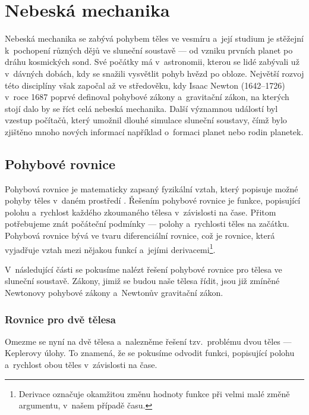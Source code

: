 \documentclass[A4paper, 12pt, oneside]{book}
\begin{document}
\chapter{Nebeská mechanika} \label{ch:celmech}
Nebeská mechanika se zabývá pohybem těles ve vesmíru a~její studium je stěžejní k~pochopení různých dějů ve sluneční soustavě --- od vzniku prvních planet po dráhu kosmických sond. Své počátky má v~astronomii, kterou se lidé zabývali už v~dávných dobách, kdy se snažili vysvětlit pohyb hvězd po obloze. Největší rozvoj této disciplíny však započal až ve středověku, kdy Isaac Newton (1642--1726) v~roce 1687 poprvé definoval pohybové zákony a~gravitační zákon, na kterých stojí dalo by se říct celá nebeská mechanika. Další významnou událostí byl vzestup počítačů, který umožnil dlouhé simulace sluneční soustavy, čímž bylo zjištěno mnoho nových informací například o~formaci planet nebo rodin planetek.

\section{Pohybové rovnice}
Pohybová rovnice je matematicky zapsaný fyzikální vztah, který popisuje možné pohyby těles v~daném prostředí \cite{wiki:eqm}. Řešením pohybové rovnice je funkce, popisující polohu a~rychlost každého zkoumaného tělesa v~závislosti na čase. Přitom potřebujeme znát počáteční podmínky --- polohy a~rychlosti těles na začátku. Pohybová rovnice bývá ve tvaru diferenciální rovnice, což je rovnice, která vyjadřuje vztah mezi nějakou funkcí a~jejími derivacemi\footnote{Derivace označuje okamžitou změnu hodnoty funkce při velmi malé změně argumentu, v~našem případě času.}.

V~následující části se pokusíme nalézt řešení pohybové rovnice pro tělesa ve sluneční soustavě. Zákony, jimiž se budou naše tělesa řídit, jsou již zmíněné Newtonovy pohybové zákony a~Newtonův gravitační zákon.
\subsection{Rovnice pro dvě tělesa} \label{sec:2body}
Omezme se nyní na dvě tělesa a~nalezněme řešení tzv.\ problému dvou těles --- Keplerovy úlohy. To znamená, že se pokusíme odvodit funkci, popisující polohu a~rychlost obou těles v~závislosti na čase. 
\end{document}
